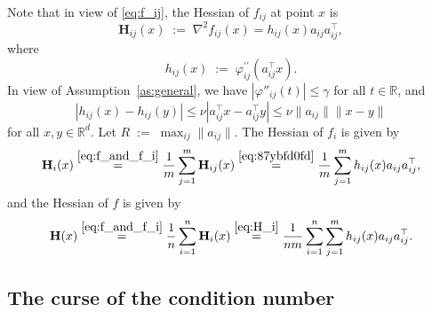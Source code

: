 \documentclass[10pt]{article}
\newcommand{\squeeze}{}
\newcommand{\eqdef}{\; { := }\;}
\newcommand{\R}{\mathbb{R}}
\newcommand{\newalpha}{h}
\newcommand{\mH}{\mathbf{H}}
\begin{document}
Note that in view of \eqref{eq:f_ij}, the Hessian of $f_{ij}$ at point $x$ is
\begin{equation}
\label{eq:87ybfd0fd}
\mH_{ij}(x) \eqdef 
\nabla^2 f_{ij}(x) = 
\newalpha_{ij}(x) a_{ij}a_{ij}^\top, 
\end{equation}
where
\begin{equation}\label{eq:h_ij-def} \newalpha_{ij}(x) \eqdef \varphi^{\prime\prime}_{ij}(a_{ij}^\top x).\end{equation} In view of Assumption~\ref{as:general}, we have $|\varphi''_{ij}(t)| \leq \gamma$ for all $t\in \R$, and 
\begin{equation}
|\newalpha_{ij}(x) - \newalpha_{ij}(y)| \leq \nu |a_{ij}^\top x - a_{ij}^\top y| \leq \nu \|a_{ij}\|  \|x-y\| \label{eq:alphaijL} 
\end{equation}
for all $x, y \in \R^d$. Let $R\eqdef \max_{ij} \|a_{ij}\|$. The Hessian of $f_i$ is given by
\begin{equation}\label{eq:H_i} \squeeze \mH_i(x) \overset{\eqref{eq:f_and_f_i}  }{=}
\frac{1}{m}\sum\limits_{j=1}^m \mH_{ij}(x) \overset{\eqref{eq:87ybfd0fd}}{=} \frac{1}{m}\sum\limits\limits_{j=1}^m \newalpha_{ij}(x) a_{ij}a_{ij}^\top,\end{equation}
and the Hessian of $f$ is given by
\begin{equation}\label{eq:H}\squeeze \mH(x) \overset{\eqref{eq:f_and_f_i}  }{=}
\frac{1}{n}\sum\limits_{i=1}^n \mH_{i}(x) \overset{\eqref{eq:H_i}}{=} \frac{1}{nm}\sum \limits_{i=1}^n   \sum\limits_{j=1}^m \newalpha_{ij}(x) a_{ij}a_{ij}^\top.\end{equation}


\subsection{The curse of the condition number}
 
\end{document}
